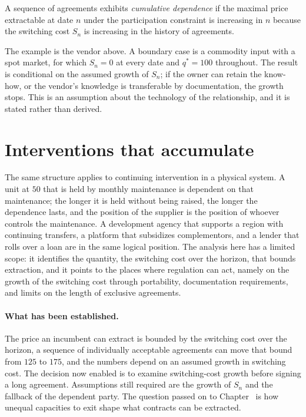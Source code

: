 \begin{definition}\label{def:cum-dep}
A sequence of agreements exhibits \emph{cumulative dependence} if the maximal price extractable at date $n$ under the participation constraint is increasing in $n$ because the switching cost $S_n$ is increasing in the history of agreements.
\end{definition}

The example is the vendor above. A boundary case is a commodity input with a spot market, for which $S_n=0$ at every date and $q^*=100$ throughout. The result is conditional on the assumed growth of $S_n$; if the owner can retain the know-how, or the vendor's knowledge is transferable by documentation, the growth stops. This is an assumption about the technology of the relationship, and it is stated rather than derived.

\section{Interventions that accumulate}

The same structure applies to continuing intervention in a physical system. A unit at $50$ that is held by monthly maintenance is dependent on that maintenance; the longer it is held without being raised, the longer the dependence lasts, and the position of the supplier is the position of whoever controls the maintenance. A development agency that supports a region with continuing transfers, a platform that subsidizes complementors, and a lender that rolls over a loan are in the same logical position. The analysis here has a limited scope: it identifies the quantity, the switching cost over the horizon, that bounds extraction, and it points to the places where regulation can act, namely on the growth of the switching cost through portability, documentation requirements, and limits on the length of exclusive agreements.

\paragraph{What has been established.} The price an incumbent can extract is bounded by the switching cost over the horizon, a sequence of individually acceptable agreements can move that bound from $125$ to $175$, and the numbers depend on an assumed growth in switching cost. The decision now enabled is to examine switching-cost growth before signing a long agreement. Assumptions still required are the growth of $S_n$ and the fallback of the dependent party. The question passed on to Chapter~ is how unequal capacities to exit shape what contracts can be extracted.

